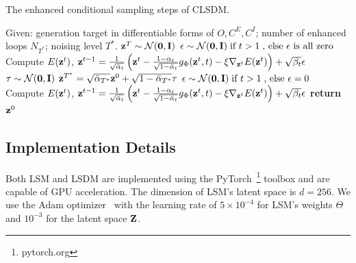 \begin{algorithm}
    \caption{The enhanced conditional sampling steps of CLSDM.}
    \label{ch6:alg:abs_sample_enhanced_conditional_diffusion}
    \begin{algorithmic}
        \State Given: generation target in differentiable forms of $O,C^E,C^I$;
        \State \qquad\quad number of enhanced loops $N_{T^*}$;
        \State \qquad\quad noising level $T^*$.
        \State $\mathbf{z}^T \sim \mathcal{N}(\mathbf{0}, \mathbf{I})$
            \State $\mathbf{\epsilon} \sim \mathcal{N}(\mathbf{0}, \mathbf{I})\;\text{if } t>1\;\text{, else } \mathbf{\epsilon}\text{ is all zero}$ 
            \State Compute $E(\mathbf{z}^t)$,
            \State $\mathbf{z}^{t-1} = 
                \frac{1}{\sqrt{\Bar{\alpha}_t}} 
                \left( 
                    \mathbf{z}^t - 
                    \frac{1-\alpha_t}{\sqrt{1-\Bar{\alpha}_t}} g_\Phi(\mathbf{z}^t, t) - 
                    \xi\nabla_{\mathbf{z}^t} E(\mathbf{z}^t) 
                \right) 
                + \sqrt{\beta_t}\mathbf{\epsilon}$
        \EndFor 
            \State $\mathbf{\tau} \sim \mathcal{N}(\mathbf{0}, \mathbf{I})$
            \State $\mathbf{z}^{T^*} = \sqrt{\Bar{\alpha}_{T^*}} \mathbf{z}^0 + \sqrt{1-\Bar{\alpha}_{T^*}}\mathbf{\tau}$
                \State $\mathbf{\epsilon} \sim \mathcal{N}(\mathbf{0}, \mathbf{I})\;\text{if } t>1\;\text{, else } \mathbf{\epsilon}=0$ 
                \State Compute $E(\mathbf{z}^t)$,
                \State $\mathbf{z}^{t-1} = 
                    \frac{1}{\sqrt{\Bar{\alpha}_t}} 
                    \left( 
                        \mathbf{z}^t - 
                        \frac{1-\alpha_t}{\sqrt{1-\Bar{\alpha}_t}} g_\Phi(\mathbf{z}^t, t) - 
                        \xi\nabla_{\mathbf{z}^t} E(\mathbf{z}^t) 
                    \right) 
                    + \sqrt{\beta_t}\mathbf{\epsilon}$
            \EndFor
        \EndFor
        \State \textbf{return} {$\mathbf{z}^0$}
    \end{algorithmic}
\end{algorithm}

\subsection{Implementation Details}
Both LSM and LSDM are implemented using the PyTorch~\footnote{pytorch.org} toolbox and are capable of GPU acceleration. The dimension of LSM's latent space is $d=256$. We use the Adam optimizer~\cite{ai.Kingma2015b} with the learning rate of $5\times10^{-4}$ for LSM's weights $\Theta$ and $10^{-3}$ for the latent space $\mathbf{Z}$.

